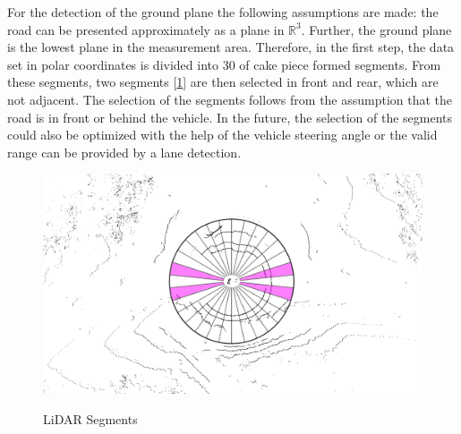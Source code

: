 \documentclass[11pt,oneside,openright]{mpreport}
\begin{document}

For the detection of the ground plane the following assumptions are made: the road can be presented approximately as a plane in $\mathbb{R}^3$.
Further, the ground plane is the lowest plane in the measurement area. Therefore, in the first step, the data set in polar coordinates is divided into 30 of cake piece formed segments.
From these segments, two segments [\cref{segments}] are then selected in front and rear, which are not adjacent. The selection of the segments follows from the assumption that the road is in front or behind the vehicle. In the future, the selection of the segments could also be optimized with the help of the vehicle steering angle 
or the valid range can be provided by a lane detection.

\begin{figure}[!ht]
\caption{LiDAR Segments}
\includegraphics[width=\textwidth]{bilder/segments.png}
\label{segments}
\end{figure}
\end{document}
